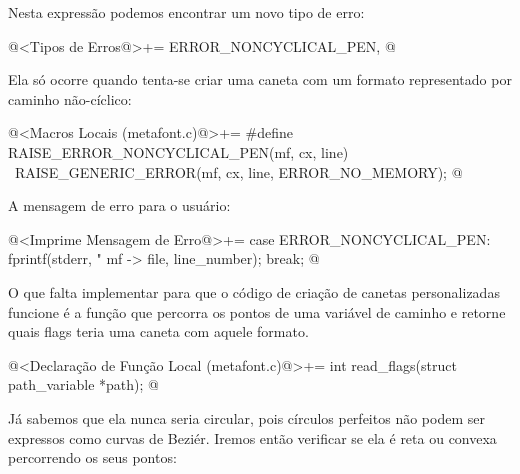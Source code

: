 {{{{{{Nesta expressão podemos encontrar um novo tipo de erro:

\iniciocodigo
@<Tipos de Erros@>+=
ERROR_NONCYCLICAL_PEN,
@
\fimcodigo

Ela só ocorre quando tenta-se criar uma caneta com um formato
representado por caminho não-cíclico:

\iniciocodigo
@<Macros Locais (metafont.c)@>+=
#define RAISE_ERROR_NONCYCLICAL_PEN(mf, cx, line) {\
  RAISE_GENERIC_ERROR(mf, cx, line, ERROR_NO_MEMORY);}
@
\fimcodigo

A mensagem de erro para o usuário:

\iniciocodigo
@<Imprime Mensagem de Erro@>+=
case ERROR_NONCYCLICAL_PEN:
  fprintf(stderr, "%
          mf -> file, line_number);
  break;
@
\fimcodigo

O que falta implementar para que o código de criação de canetas
personalizadas funcione é a função que percorra os pontos de uma
variável de caminho e retorne quais flags teria uma caneta com aquele
formato.

\iniciocodigo
@<Declaração de Função Local (metafont.c)@>+=
int read_flags(struct path_variable *path);
@
\fimcodigo

Já sabemos que ela nunca seria circular, pois círculos perfeitos não
podem ser expressos como curvas de Beziér. Iremos então verificar se
ela é reta ou convexa percorrendo os seus pontos:

}}}}}}
